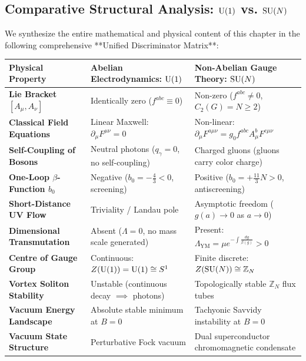 \subsection{Comparative Structural Analysis: \texorpdfstring{$\mathrm{U}(1)$}{U(1)} vs. \texorpdfstring{$\mathrm{SU}(N)$}{SU(N)}}
\label{subsec:comparative_structural_analysis}

We synthesize the entire mathematical and physical content of this chapter in the following comprehensive **Unified Discriminator Matrix**:

\begin{table}[htbp]
\centering
\small
\renewcommand{\arraystretch}{1.35}
\begin{tabular}{|p{3.8cm}|p{5.0cm}|p{5.4cm}|}
\hline
\textbf{Physical Property} & \textbf{Abelian Electrodynamics: $\mathrm{U}(1)$} & \textbf{Non-Abelian Gauge Theory: $\mathrm{SU}(N)$} \\
\hline
\textbf{Lie Bracket $[A_\mu, A_\nu]$} & Identically zero ($f^{abc} \equiv 0$) & Non-zero ($f^{abc} \ne 0$, $C_2(G) = N \ge 2$) \\
\hline
\textbf{Classical Field Equations} & Linear Maxwell: $\partial_\mu F^{\mu\nu} = 0$ & Non-linear: $\partial_\mu F^{a\mu\nu} = g_0 f^{abc} A_\mu^b F^{c\mu\nu}$ \\
\hline
\textbf{Self-Coupling of Bosons} & Neutral photons ($q_\gamma = 0$, no self-coupling) & Charged gluons (gluons carry color charge) \\
\hline
\textbf{One-Loop $\beta$-Function $b_0$} & Negative ($b_0 = -\frac{4}{3} < 0$, screening) & Positive ($b_0 = +\frac{11}{3}N > 0$, antiscreening) \\
\hline
\textbf{Short-Distance UV Flow} & Triviality / Landau pole & Asymptotic freedom ($g(a) \to 0$ as $a \to 0$) \\
\hline
\textbf{Dimensional Transmutation} & Absent ($\Lambda = 0$, no mass scale generated) & Present: $\Lambda_{\mathrm{YM}} = \mu e^{-\int \frac{dg}{\beta(g)}} > 0$ \\
\hline
\textbf{Centre of Gauge Group} & Continuous: $Z(\mathrm{U}(1)) = \mathrm{U}(1) \cong S^1$ & Finite discrete: $Z(\mathrm{SU}(N)) \cong \mathbb{Z}_N$ \\
\hline
\textbf{Vortex Soliton Stability} & Unstable (continuous decay $\implies$ photons) & Topologically stable $\mathbb{Z}_N$ flux tubes \\
\hline
\textbf{Vacuum Energy Landscape} & Absolute stable minimum at $B = 0$ & Tachyonic Savvidy instability at $B = 0$ \\
\hline
\textbf{Vacuum State Structure} & Perturbative Fock vacuum & Dual superconductor chromomagnetic condensate \\

\end{tabular}
\end{table}
